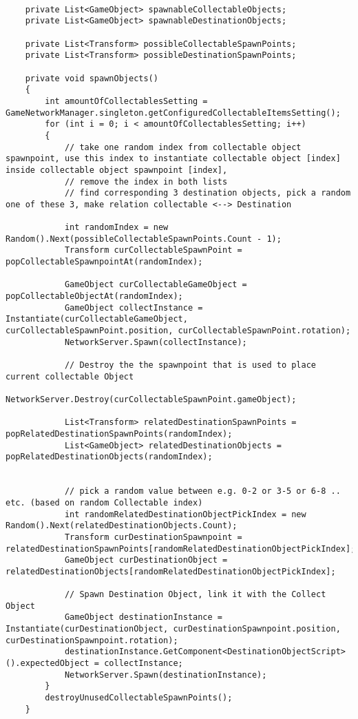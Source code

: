 \begin{lstlisting}[caption= PrepareGameManager.cs Variablen und spawnObjects()]
	
	private List<GameObject> spawnableCollectableObjects;
	private List<GameObject> spawnableDestinationObjects;
	
	private List<Transform> possibleCollectableSpawnPoints;
	private List<Transform> possibleDestinationSpawnPoints;
	
	private void spawnObjects()
	{
		int amountOfCollectablesSetting = GameNetworkManager.singleton.getConfiguredCollectableItemsSetting();
		for (int i = 0; i < amountOfCollectablesSetting; i++)
		{
			// take one random index from collectable object spawnpoint, use this index to instantiate collectable object [index] inside collectable object spawnpoint [index],
			// remove the index in both lists
			// find corresponding 3 destination objects, pick a random one of these 3, make relation collectable <--> Destination
			
			int randomIndex = new Random().Next(possibleCollectableSpawnPoints.Count - 1);
			Transform curCollectableSpawnPoint = popCollectableSpawnpointAt(randomIndex);
			
			GameObject curCollectableGameObject = popCollectableObjectAt(randomIndex);
			GameObject collectInstance = Instantiate(curCollectableGameObject, curCollectableSpawnPoint.position, curCollectableSpawnPoint.rotation);
			NetworkServer.Spawn(collectInstance);
			
			// Destroy the the spawnpoint that is used to place current collectable Object
			NetworkServer.Destroy(curCollectableSpawnPoint.gameObject);
			
			List<Transform> relatedDestinationSpawnPoints = popRelatedDestinationSpawnPoints(randomIndex);
			List<GameObject> relatedDestinationObjects = popRelatedDestinationObjects(randomIndex);
			
			
			// pick a random value between e.g. 0-2 or 3-5 or 6-8 .. etc. (based on random Collectable index)
			int randomRelatedDestinationObjectPickIndex = new Random().Next(relatedDestinationObjects.Count);
			Transform curDestinationSpawnpoint = relatedDestinationSpawnPoints[randomRelatedDestinationObjectPickIndex];
			GameObject curDestinationObject = relatedDestinationObjects[randomRelatedDestinationObjectPickIndex];
			
			// Spawn Destination Object, link it with the Collect Object
			GameObject destinationInstance = Instantiate(curDestinationObject, curDestinationSpawnpoint.position, curDestinationSpawnpoint.rotation);
			destinationInstance.GetComponent<DestinationObjectScript>().expectedObject = collectInstance;
			NetworkServer.Spawn(destinationInstance);
		}
		destroyUnusedCollectableSpawnPoints();
	}
\end{lstlisting}

